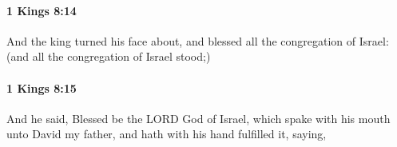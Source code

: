 		\paragraph{1 Kings 8:14} %
			\label{1KINGS-8-14}

			And the king turned his face about, and blessed all the congregation of Israel: (and all the congregation of Israel stood;)


		\paragraph{1 Kings 8:15} %
			\label{1KINGS-8-15}

			And he said, Blessed be the LORD God of Israel, which spake with his mouth unto David my father, and hath with his hand fulfilled it, saying,


